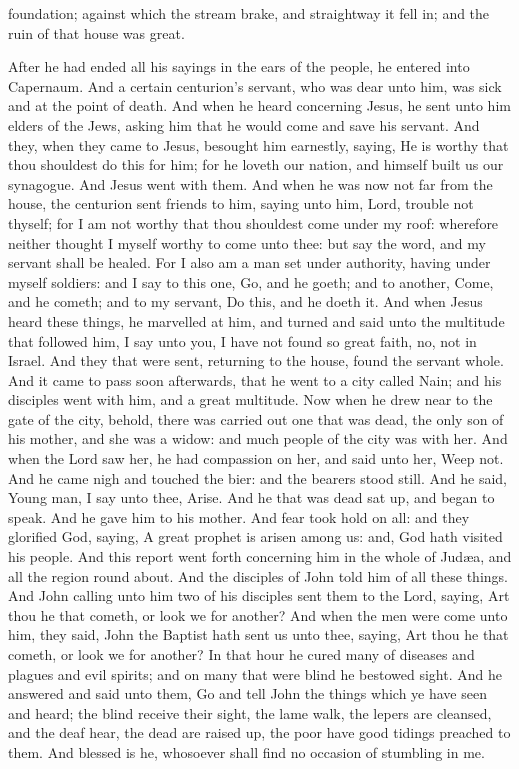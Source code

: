 foundation; against which the stream brake, and straightway it fell in; and the ruin of that house was great. 

After he had ended all his sayings in the ears of the people, he entered into Capernaum.  And a certain centurion’s servant, who was dear unto him, was sick and at the point of death. And when he heard concerning Jesus, he sent unto him elders of the Jews, asking him that he would come and save his servant. And they, when they came to Jesus, besought him earnestly, saying, He is worthy that thou shouldest do this for him; for he loveth our nation, and himself built us our synagogue. And Jesus went with them. And when he was now not far from the house, the centurion sent friends to him, saying unto him, Lord, trouble not thyself; for I am not worthy that thou shouldest come under my roof: wherefore neither thought I myself worthy to come unto thee: but say the word, and my servant shall be healed. For I also am a man set under authority, having under myself soldiers: and I say to this one, Go, and he goeth; and to another, Come, and he cometh; and to my servant, Do this, and he doeth it. And when Jesus heard these things, he marvelled at him, and turned and said unto the multitude that followed him, I say unto you, I have not found so great faith, no, not in Israel. And they that were sent, returning to the house, found the servant whole.  And it came to pass soon afterwards, that he went to a city called Nain; and his disciples went with him, and a great multitude. Now when he drew near to the gate of the city, behold, there was carried out one that was dead, the only son of his mother, and she was a widow: and much people of the city was with her. And when the Lord saw her, he had compassion on her, and said unto her, Weep not. And he came nigh and touched the bier: and the bearers stood still. And he said, Young man, I say unto thee, Arise. And he that was dead sat up, and began to speak. And he gave him to his mother. And fear took hold on all: and they glorified God, saying, A great prophet is arisen among us: and, God hath visited his people. And this report went forth concerning him in the whole of Judæa, and all the region round about.  And the disciples of John told him of all these things. And John calling unto him two of his disciples sent them to the Lord, saying, Art thou he that cometh, or look we for another? And when the men were come unto him, they said, John the Baptist hath sent us unto thee, saying, Art thou he that cometh, or look we for another? In that hour he cured many of diseases and plagues and evil spirits; and on many that were blind he bestowed sight. And he answered and said unto them, Go and tell John the things which ye have seen and heard; the blind receive their sight, the lame walk, the lepers are cleansed, and the deaf hear, the dead are raised up, the poor have good tidings preached to them. And blessed is he, whosoever shall find no occasion of stumbling in me.  